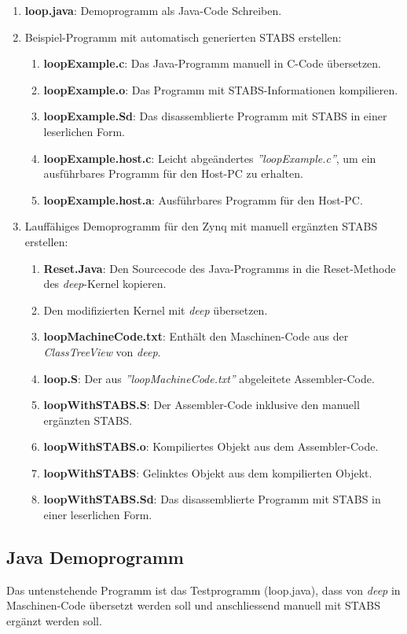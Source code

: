 \begin{enumerate}
	\item \textbf{loop.java}: Demoprogramm als Java-Code Schreiben.
	\item Beispiel-Programm mit automatisch generierten STABS erstellen:
	\begin{enumerate}
		\item \textbf{loopExample.c}: Das Java-Programm manuell in C-Code übersetzen.
		\item \textbf{loopExample.o}: Das Programm mit STABS-Informationen kompilieren.
		\item \textbf{loopExample.Sd}: Das disassemblierte Programm mit STABS in einer leserlichen Form.
		\item \textbf{loopExample.host.c}: Leicht abgeändertes \textit{''loopExample.c''}, um ein ausführbares Programm für den Host-PC zu erhalten.
		\item \textbf{loopExample.host.a}: Ausführbares Programm für den Host-PC.
	\end{enumerate}
	\item Lauffähiges Demoprogramm für den Zynq mit manuell ergänzten STABS erstellen:
	\begin{enumerate}
		\item \textbf{Reset.Java}: Den Sourcecode des Java-Programms in die Reset-Methode des \textit{deep}-Kernel kopieren.
		\item Den modifizierten Kernel mit \textit{deep} übersetzen.
		\item \textbf{loopMachineCode.txt}: Enthält den Maschinen-Code aus der \textit{ClassTreeView} von \textit{deep}.
		\item \textbf{loop.S}: Der aus \textit{''loopMachineCode.txt''} abgeleitete Assembler-Code.
		\item \textbf{loopWithSTABS.S}: Der Assembler-Code inklusive den manuell ergänzten STABS.
		\item \textbf{loopWithSTABS.o}: Kompiliertes Objekt aus dem Assembler-Code.
		\item \textbf{loopWithSTABS}: Gelinktes Objekt aus dem kompilierten Objekt.
		\item \textbf{loopWithSTABS.Sd}: Das disassemblierte Programm mit STABS in einer leserlichen Form.
	\end{enumerate}
\end{enumerate}



\subsection{Java Demoprogramm}
Das untenstehende Programm ist das Testprogramm (loop.java), dass von \textit{deep} in Maschinen-Code übersetzt werden soll und anschliessend manuell mit STABS ergänzt werden soll.

